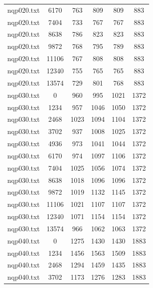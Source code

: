 \documentclass[12pt]{article}
\begin{document}
{\begin{longtable}{c|c|cccc}
		nqp020.txt    &   6170    &   763    &   809    &   809    & 883        \\
		nqp020.txt    &   7404    &   733    &   767    &   767    & 883        \\
		nqp020.txt    &   8638    &   786    &   823    &   823    & 883        \\
		nqp020.txt    &   9872    &   768    &   795    &   789    & 883        \\
		nqp020.txt    &   11106   &   767    &   808    &   808    & 883        \\
		nqp020.txt    &   12340   &   755    &   765    &   765    & 883        \\
		nqp020.txt    &   13574   &   729    &   801    &   768    & 883        \\ \hline
		nqp030.txt    &   0       &   960    &   995    &   1021   & 1372       \\
		nqp030.txt    &   1234    &   957    &   1046   &   1050   & 1372       \\
		nqp030.txt    &   2468    &   1023   &   1094   &   1104   & 1372       \\
		nqp030.txt    &   3702    &   937    &   1008   &   1025   & 1372       \\
		nqp030.txt    &   4936    &   973    &   1041   &   1044   & 1372       \\
		nqp030.txt    &   6170    &   974    &   1097   &   1106   & 1372       \\
		nqp030.txt    &   7404    &   1025   &   1056   &   1074   & 1372       \\
		nqp030.txt    &   8638    &   1018   &   1096   &   1096   & 1372       \\
		nqp030.txt    &   9872    &   1019   &   1132   &   1145   & 1372       \\
		nqp030.txt    &   11106   &   1021   &   1107   &   1107   & 1372       \\
		nqp030.txt    &   12340   &   1071   &   1154   &   1154   & 1372       \\
		nqp030.txt    &   13574   &   966    &   1062   &   1063   & 1372       \\ \hline
		nqp040.txt    &   0       &   1275   &   1430   &   1430   & 1883       \\
		nqp040.txt    &   1234    &   1456   &   1563   &   1509   & 1883       \\
		nqp040.txt    &   2468    &   1294   &   1459   &   1435   & 1883       \\
		nqp040.txt    &   3702    &   1173   &   1276   &   1283   & 1883       \\

\end{longtable}}
\end{document}
